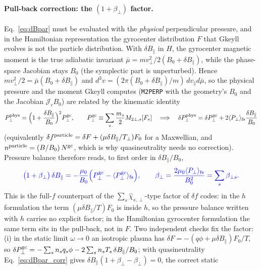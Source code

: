\documentclass[11pt, letterpaper]{article}
\newcommand{\dBpar}{\delta B_\parallel}
\newcommand{\vpar}{v_\parallel}
\newcommand{\code}[1]{\texttt{#1}}
\newcommand{\new}[1]{\textcolor{blue}{#1}}
\begin{document}
\paragraph{Pull-back correction: the $(1+\beta_\perp)$ factor.}
\label{par:pullback}
Eq.~\eqref{eq:dBpar} must be evaluated with the \emph{physical} perpendicular pressure, and in
the Hamiltonian representation the gyrocenter distribution $F$ that Gkeyll evolves is not the
particle distribution. With $\dBpar$ in $H$, the gyrocenter magnetic moment is the true adiabatic
invariant $\bar\mu = m v_\perp^2/2(B_0+\dBpar)$, while the phase-space Jacobian stays $B_0$
(the symplectic part is unperturbed). Hence $m v_\perp^2/2 = \bar\mu(B_0+\dBpar)$ and
$d^3v = (2\pi (B_0+\dBpar)/m)\,d\vpar d\bar\mu$, so the physical pressure and the moment Gkeyll
computes (\code{M2PERP} with the geometry's $B_0$ and the Jacobian $\mathcal{J}_cB_0$) are related
by the kinematic identity
\begin{equation}
  P_\perp^{\rm phys} = \Big(1+\frac{\dBpar}{B_0}\Big)^2 P_\perp^{\rm gc},\qquad
  P_\perp^{\rm gc} \equiv \sum_s\frac{m_s}{2}M_{2\perp,s}[F_s]
  \quad\Longrightarrow\quad
  \delta P_\perp^{\rm phys} = \delta P_\perp^{\rm gc} + 2\langle P_\perp\rangle_{\rm fs}\frac{\dBpar}{B_0}
  \label{eq:pullback}
\end{equation}
(equivalently $\delta f^{\rm particle} = \delta F + (\mu\dBpar/T_\perp)F_0$ for a Maxwellian, and
$n^{\rm particle} = (B/B_0)\,N^{\rm gc}$, which is why quasineutrality needs no correction).
Pressure balance therefore reads, to first order in $\dBpar/B_0$,
\begin{equation}
  \new{\big(1+\beta_\perp\big)\,\dBpar = -\frac{\mu_0}{B_0}\Big(P_\perp^{\rm gc}-\langle P_\perp^{\rm gc}\rangle_{\rm fs}\Big),
  \qquad \beta_\perp = \frac{2\mu_0\langle P_\perp\rangle_{\rm fs}}{B_0^2} = \sum_s\beta_{\perp s}.}
  \label{eq:dBpar_corr}
\end{equation}
This is the full-$f$ counterpart of the $\sum_s\hat\chi_{s,\perp}$-type factor of $\delta f$
codes: in the $h$ formulation the term $(\mu\dBpar/T)F_0$ is inside $h$, so the pressure balance
written with $h$ carries no explicit factor; in the Hamiltonian gyrocenter formulation the same
term sits in the pull-back, not in $F$. Two independent checks fix the factor: (i) in the static
limit $\omega\to0$ an isotropic plasma has $\delta F = -(q\phi+\mu\dBpar)F_0/T$, so
$\delta P_\perp^{\rm gc} = -\sum_s n_s q_s\phi - 2\sum_s n_sT_s\,\dBpar/B_0$; with quasineutrality
Eq.~\eqref{eq:dBpar_corr} gives $\dBpar(1+\beta_\perp-\beta_\perp)=0$, the correct static
\end{document}
